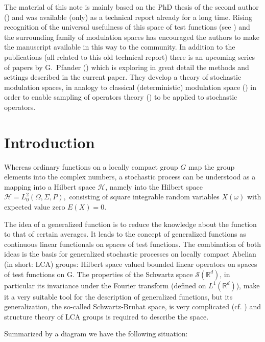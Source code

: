 \documentclass[graybox]{svmult}
\begin{document}
The material of this note
is mainly based on the PhD thesis of the second author (\cite{ho89})
and was available (only) as a technical report already for a long time.
Rising recognition of the universal usefulness of this space of
test functions (see \cite{gr01,cofelu08,fe09})
and the surrounding family of modulation spaces
has encouraged the authors to make the manuscript available
in this way to the community. In addition to the publications \cite{ke03,wa05,wa06-2} (all related to this old technical
report)  there is an upcoming series of papers by G.~Pfander
(\cite{pfwa05-1,pfzhXX-1,pfzhXX,pfzhXX-B,okpfzh11})
which is exploring in great detail
the methods and settings described in the current paper.
% 
They develop a theory of stochastic modulation spaces, in analogy to classical (deterministic) modulation space (\cite{fe06}) in order to enable sampling of operators theory
(\cite{pf13-1,pfwaXX,kopf06})
to be applied to stochastic operators.



\section{Introduction}

Whereas ordinary functions on a locally compact group $G$ map the
group elements into the complex numbers, a stochastic process
can be understood as a mapping into a Hilbert space $\mathcal{H}$,
namely into the Hilbert space  $\mathcal{H} =   L^2_0(\varOmega,\varSigma,P),$
consisting of square integrable random variables $X(\omega)$
with expected value zero $E(X) = 0$.

The idea of a generalized function is to reduce the
knowledge about the function to that of certain averages.
It leads to the
concept of generalized functions as continuous
linear functionals on spaces
of test functions. The combination of both ideas is
the basis for generalized
stochastic processes on locally compact Abelian
(in short: LCA) groups:
Hilbert space valued bounded linear operators on spaces
of test functions on G. The properties of
the Schwartz space $\mathcal{S}(\mathbb{R}^d)$,
in particular its invariance under the
Fourier transform (defined on $L^1(\mathbb{R}^d)$),
make it a very suitable tool for the description of
generalized functions, but its generalization, the so-called
Schwartz-Bruhat space, is very complicated
(cf. \cite{re89}) and structure theory of LCA
groups is required to describe the space.

Summarized by a diagram we have the following situation:
\end{document}
